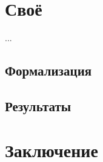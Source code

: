 \documentclass{beamer}
\begin{document}
\section{Своё}
%
\begin{frame}{...}

\end{frame}

\subsection{Формализация}


\subsection{Результаты}


\section{Заключение}

\end{document}
